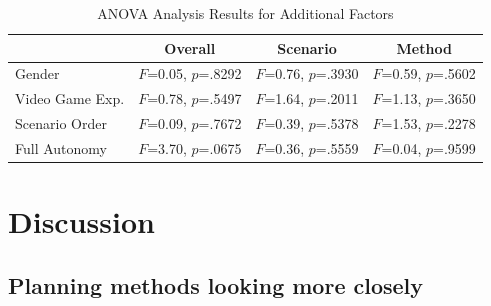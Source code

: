 \documentclass[journal]{IEEEtran}
\begin{document}
\begin{table}
\caption{ANOVA Analysis Results for Additional Factors}
\scriptsize
	\centering
		\begin{tabular}
			{|l|c|c|c|}
			\hline
			 & Overall & Scenario & Method \\
			\hline
			Gender & $F$=0.05, $p$=.8292 & $F$=0.76, $p$=.3930 & $F$=0.59, $p$=.5602 \\
			\hline
			Video Game Exp. & $F$=0.78, $p$=.5497 & $F$=1.64, $p$=.2011 & $F$=1.13, $p$=.3650 \\
			\hline
			Scenario Order & $F$=0.09, $p$=.7672 & $F$=0.39, $p$=.5378 & $F$=1.53, $p$=.2278 \\
			\hline
			Full Autonomy & $F$=3.70, $p$=.0675 & $F$=0.36, $p$=.5559 & $F$=0.04, $p$=.9599 \\
			\hline			
		\end{tabular}
\label{OtherFactors}
\end{table}

\section{Discussion} 
\label{sec:Discussion}

\subsection{Planning methods looking more closely}
\end{document}
